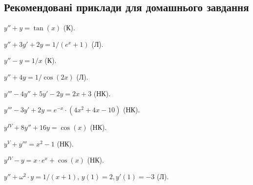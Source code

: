 \subsection*{Рекомендовані приклади для домашнього завдання}

\begin{problem}
	$y'' + y = \tan (x)$ (К).
\end{problem}

\begin{problem}
	$y'' + 3 y' + 2 y = 1 / (e^x + 1)$ (Л).
\end{problem}

\begin{problem}
	$y'' - y = 1 / x$ (К).
\end{problem}

\begin{problem}
	$y'' + 4 y = 1 / \cos (2 x)$ (Л).
\end{problem}

\begin{problem}
	$y''' - 4 y'' + 5 y' - 2 y = 2 x + 3$ (НК).
\end{problem}

\begin{problem}
	$y''' - 3 y' + 2 y = e^{-x} \cdot (4 x^2 + 4 x - 10)$ (НК).
\end{problem}

\begin{problem}
	$y^{IV} + 8 y'' + 16 y = \cos (x)$ (НК).
\end{problem}

\begin{problem}
	$y^V + y''' = x^2 - 1$ (НК).
\end{problem}

\begin{problem}
	$y^{IV} - y = x \cdot e^x + \cos (x)$ (НК).
\end{problem}

\begin{problem}
	$y'' + \omega^2 \cdot y = 1 / (x + 1)$, $y(1) = 2, y'(1) = -3$ (Л).
\end{problem}
